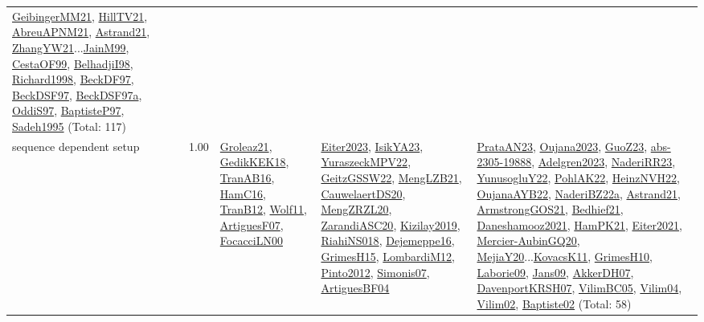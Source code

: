 {\begin{longtable}{p{3cm}r>{\raggedright\arraybackslash}p{6cm}>{\raggedright\arraybackslash}p{6cm}>{\raggedright\arraybackslash}p{8cm}}
\hyperref[detail:GeibingerMM21]{GeibingerMM21}, \hyperref[detail:HillTV21]{HillTV21}, \hyperref[detail:AbreuAPNM21]{AbreuAPNM21}, \hyperref[detail:Astrand21]{Astrand21}, \hyperref[detail:ZhangYW21]{ZhangYW21}...\hyperref[detail:JainM99]{JainM99}, \hyperref[detail:CestaOF99]{CestaOF99}, \hyperref[detail:BelhadjiI98]{BelhadjiI98}, \hyperref[detail:Richard1998]{Richard1998}, \hyperref[detail:BeckDF97]{BeckDF97}, \hyperref[detail:BeckDSF97]{BeckDSF97}, \hyperref[detail:BeckDSF97a]{BeckDSF97a}, \hyperref[detail:OddiS97]{OddiS97}, \hyperref[detail:BaptisteP97]{BaptisteP97}, \hyperref[detail:Sadeh1995]{Sadeh1995} (Total: 117)\\
\index{sequence dependent setup}\index{Concepts!sequence dependent setup}sequence dependent setup &  1.00 & \hyperref[detail:Groleaz21]{Groleaz21}, \hyperref[detail:GedikKEK18]{GedikKEK18}, \hyperref[detail:TranAB16]{TranAB16}, \hyperref[detail:HamC16]{HamC16}, \hyperref[detail:TranB12]{TranB12}, \hyperref[detail:Wolf11]{Wolf11}, \hyperref[detail:ArtiguesF07]{ArtiguesF07}, \hyperref[detail:FocacciLN00]{FocacciLN00} & \hyperref[detail:Eiter2023]{Eiter2023}, \hyperref[detail:IsikYA23]{IsikYA23}, \hyperref[detail:YuraszeckMPV22]{YuraszeckMPV22}, \hyperref[detail:GeitzGSSW22]{GeitzGSSW22}, \hyperref[detail:MengLZB21]{MengLZB21}, \hyperref[detail:CauwelaertDS20]{CauwelaertDS20}, \hyperref[detail:MengZRZL20]{MengZRZL20}, \hyperref[detail:ZarandiASC20]{ZarandiASC20}, \hyperref[detail:Kizilay2019]{Kizilay2019}, \hyperref[detail:RiahiNS018]{RiahiNS018}, \hyperref[detail:Dejemeppe16]{Dejemeppe16}, \hyperref[detail:GrimesH15]{GrimesH15}, \hyperref[detail:LombardiM12]{LombardiM12}, \hyperref[detail:Pinto2012]{Pinto2012}, \hyperref[detail:Simonis07]{Simonis07}, \hyperref[detail:ArtiguesBF04]{ArtiguesBF04} & \hyperref[detail:PrataAN23]{PrataAN23}, \hyperref[detail:Oujana2023]{Oujana2023}, \hyperref[detail:GuoZ23]{GuoZ23}, \hyperref[detail:abs-2305-19888]{abs-2305-19888}, \hyperref[detail:Adelgren2023]{Adelgren2023}, \hyperref[detail:NaderiRR23]{NaderiRR23}, \hyperref[detail:YunusogluY22]{YunusogluY22}, \hyperref[detail:PohlAK22]{PohlAK22}, \hyperref[detail:HeinzNVH22]{HeinzNVH22}, \hyperref[detail:OujanaAYB22]{OujanaAYB22}, \hyperref[detail:NaderiBZ22a]{NaderiBZ22a}, \hyperref[detail:Astrand21]{Astrand21}, \hyperref[detail:ArmstrongGOS21]{ArmstrongGOS21}, \hyperref[detail:Bedhief21]{Bedhief21}, \hyperref[detail:Daneshamooz2021]{Daneshamooz2021}, \hyperref[detail:HamPK21]{HamPK21}, \hyperref[detail:Eiter2021]{Eiter2021}, \hyperref[detail:Mercier-AubinGQ20]{Mercier-AubinGQ20}, \hyperref[detail:MejiaY20]{MejiaY20}...\hyperref[detail:KovacsK11]{KovacsK11}, \hyperref[detail:GrimesH10]{GrimesH10}, \hyperref[detail:Laborie09]{Laborie09}, \hyperref[detail:Jans09]{Jans09}, \hyperref[detail:AkkerDH07]{AkkerDH07}, \hyperref[detail:DavenportKRSH07]{DavenportKRSH07}, \hyperref[detail:VilimBC05]{VilimBC05}, \hyperref[detail:Vilim04]{Vilim04}, \hyperref[detail:Vilim02]{Vilim02}, \hyperref[detail:Baptiste02]{Baptiste02} (Total: 58)\\

\end{longtable}}
